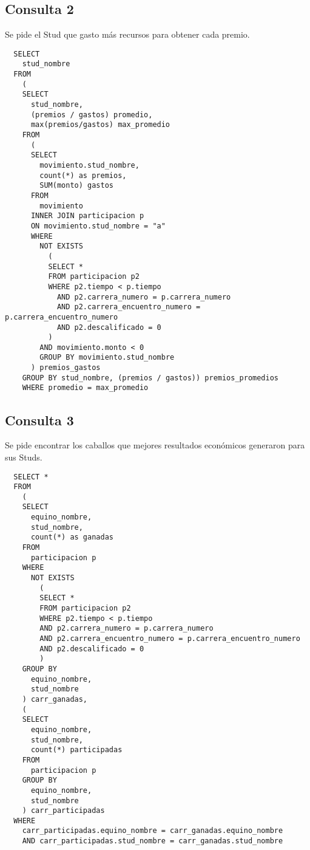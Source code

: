 \documentclass[a4paper,11pt]{article}
\begin{document}
\subsection{Consulta 2}

Se pide el Stud que gasto más recursos para obtener cada premio.

\begin{lstlisting}
  SELECT
    stud_nombre
  FROM
    (
    SELECT
      stud_nombre,
      (premios / gastos) promedio,
      max(premios/gastos) max_promedio
    FROM
      (
      SELECT
        movimiento.stud_nombre,
        count(*) as premios,
        SUM(monto) gastos
      FROM
        movimiento 
      INNER JOIN participacion p
      ON movimiento.stud_nombre = "a"
      WHERE
        NOT EXISTS
          (
          SELECT *
          FROM participacion p2
          WHERE p2.tiempo < p.tiempo
            AND p2.carrera_numero = p.carrera_numero
            AND p2.carrera_encuentro_numero = p.carrera_encuentro_numero
            AND p2.descalificado = 0
          )
        AND movimiento.monto < 0
        GROUP BY movimiento.stud_nombre
      ) premios_gastos
    GROUP BY stud_nombre, (premios / gastos)) premios_promedios
    WHERE promedio = max_promedio
\end{lstlisting}

\subsection{Consulta 3}

Se pide encontrar los caballos que mejores resultados económicos generaron para
sus Studs.

\begin{lstlisting}
  SELECT *
  FROM
    (
    SELECT
      equino_nombre,
      stud_nombre,
      count(*) as ganadas 
    FROM
      participacion p
    WHERE
      NOT EXISTS
        (
        SELECT *
        FROM participacion p2
        WHERE p2.tiempo < p.tiempo
        AND p2.carrera_numero = p.carrera_numero
        AND p2.carrera_encuentro_numero = p.carrera_encuentro_numero
        AND p2.descalificado = 0
        )
    GROUP BY
      equino_nombre,
      stud_nombre
    ) carr_ganadas,
    (
    SELECT
      equino_nombre,
      stud_nombre,
      count(*) participadas
    FROM
      participacion p
    GROUP BY
      equino_nombre,
      stud_nombre
    ) carr_participadas
  WHERE
    carr_participadas.equino_nombre = carr_ganadas.equino_nombre
    AND carr_participadas.stud_nombre = carr_ganadas.stud_nombre
\end{lstlisting}
\end{document}
